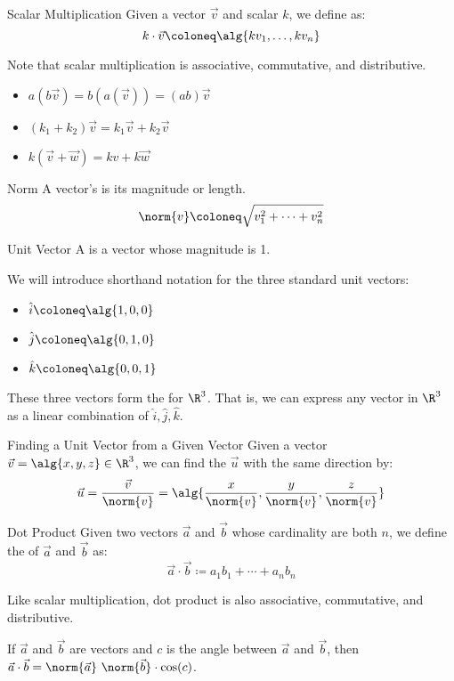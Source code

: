\documentclass[12pt]{report}
\begin{document}
\begin{dfnbox}{Scalar Multiplication}{}
    Given a vector $\vec{v}$ and scalar $k$, we define  as:
    \[ k \cdot \vec{v} \coloneq \alg{kv_1, \ldots, kv_n} \]
\end{dfnbox}

Note that scalar multiplication is associative, commutative, and distributive.
\begin{itemize}
    \item $a(b\vec{v}) = b(a(\vec{v})) = (ab) \vec{v}$
    \item $(k_1 + k_2) \vec{v} = k_1 \vec{v} + k_2 \vec{v}$
    \item $k (\vec{v} + \vec{w}) = k{v} + k\vec{w}$
\end{itemize}

\begin{dfnbox}{Norm}{}
    A vector's  is its magnitude or length.
    \tcblower
    \[ \norm{v} \coloneq \sqrt{v_1^2 + \cdots + v_n^2} \]
\end{dfnbox}

\begin{dfnbox}{Unit Vector}{}
    A  is a vector whose magnitude is 1.
\end{dfnbox}

We will introduce shorthand notation for the three standard unit vectors:
\begin{itemize}
    \item $\hat{i} \coloneq \alg{1,0,0}$
    \item $\hat{j} \coloneq \alg{0,1,0}$
    \item $\hat{k} \coloneq \alg{0,0,1}$
\end{itemize}
These three vectors form the  for $\R^3$. That is, we can express any vector in $\R^3$ as a linear combination of $\hat{i}, \hat{j}, \hat{k}$.

\begin{tecbox}{Finding a Unit Vector from a Given Vector}{}
    Given a vector $\vec{v} = \alg{x, y, z} \in \R^3$, we can find the  $\vec{u}$ with the same direction by:
    \[ \vec{u} = \frac{\vec{v}}{\norm{v}} = \alg{\frac{x}{\norm{v}}, \frac{y}{\norm{v}}, \frac{z}{\norm{v}}} \]
\end{tecbox}

\begin{dfnbox}{Dot Product}{}
    Given two vectors $\vec{a}$ and $\vec{b}$ whose cardinality are both $n$, we define the  of $\vec{a}$ and $\vec{b}$ as:
    \[ \vec{a} \cdot \vec{b} \coloneq a_1b_1 + \cdots + a_nb_n \]
\end{dfnbox}

Like scalar multiplication, dot product is also associative, commutative, and distributive.

\begin{thmbox}{}{}
    If $\vec{a}$ and $\vec{b}$ are vectors and $c$ is the angle between $\vec{a}$ and $\vec{b}$, then $\vec{a} \cdot \vec{b} = \norm{\vec{a}} \ \norm{\vec{b}} \cdot \cos(c)$.
\end{thmbox}

\makeamzindex
\end{document}
